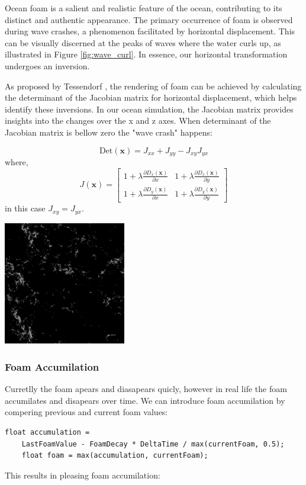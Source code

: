 Ocean foam is a salient and realistic feature of the ocean, contributing to its distinct and authentic appearance. The primary occurrence of foam is observed during wave crashes, a phenomenon facilitated by horizontal displacement. This can be visually discerned at the peaks of waves where the water curls up, as illustrated in Figure \ref{fig:wave_curl}. In essence, our horizontal transformation undergoes an inversion.

As proposed by Tessendorf \cite{tessendorf2001}, the rendering of foam can be achieved by calculating the determinant of the Jacobian matrix for horizontal displacement, which helps identify these inversions. In our ocean simulation, the Jacobian matrix provides insights into the changes over the x and z axes. When determinant of the Jacobian matrix is bellow zero the "wave crash" happens:

\begin{equation}
    \text{Det}(\mathbf{x}) = J_{xx} + J_{yy} - J_{xy} J_{yx}
\end{equation}
where,
\begin{equation}
    J(\mathbf{x}) = 
    \begin{bmatrix} 
        1 + \lambda\frac{\partial D_x(\mathbf{x})}{\partial x} & 1 + \lambda\frac{\partial D_x(\mathbf{x})}{\partial y} \\
        1 + \lambda\frac{\partial D_y(\mathbf{x})}{\partial x} & 1 + \lambda\frac{\partial D_y(\mathbf{x})}{\partial y} 
    \end{bmatrix} 
\end{equation}
in this case $J_{xy} = J_{yx}$.

\begin{minipage}{1\textwidth}
    \centering
    \includegraphics[width=0.40\textwidth]{"images/foam_texture.png"}
    \label{fig:foam_texture}
\end{minipage}

\subsubsection{Foam Accumilation}
Curretlly the foam apears and diasapears quicly, however in real life the foam accumilates and disapears over time.
We can introduce foam accumilation by compering previous and current foam values:
\begin{lstlisting}[caption={Foam Accumilation}, frame=single, numberstyle=\small\color{gray}, captionpos=b]
    float accumulation = 
    LastFoamValue - FoamDecay * DeltaTime / max(currentFoam, 0.5);
    float foam = max(accumulation, currentFoam);
\end{lstlisting}
This results in pleasing foam accumilation:

